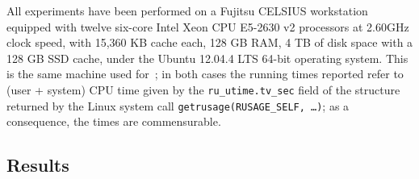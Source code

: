 \documentclass{sig-alternate}
\begin{document}
All experiments have been performed on a Fujitsu CELSIUS workstation equipped
with twelve six-core Intel Xeon CPU E5-2630 v2 processors at 2.60GHz clock speed,
with 15,360 KB cache each, 128 GB RAM,
4 TB of disk space with a 128 GB SSD cache,
under the Ubuntu  12.04.4 LTS 64-bit operating system.
This is the same machine used for~\cite{TettamanziFaronZuckerGandon2014ekaw};
in both cases the running times reported refer to (user + system) CPU time
given by the \texttt{ru\_utime.tv\_sec} field of the structure returned by
the Linux system call \texttt{getrusage(RUSAGE\_SELF, \dots)};
as a consequence, the times are commensurable.


\subsection{Results}
\end{document}
